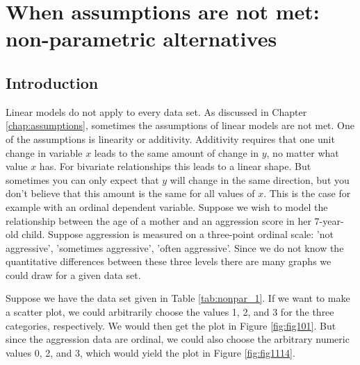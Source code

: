 \documentclass[]{report}\usepackage[]{graphicx}\usepackage[]{color}
\begin{document}

\chapter{When assumptions are not met: non-parametric alternatives}\label{chap:nonpar1}


\section{Introduction}

Linear models do not apply to every data set. As discussed in Chapter \ref{chap:assumptions}, sometimes the assumptions of linear models are not met. One of the assumptions is linearity or additivity. Additivity requires that one unit change in variable $x$ leads to the same amount of change in $y$, no matter what value $x$ has. For bivariate relationships this leads to a linear shape. But sometimes you can only expect that $y$ will change in the same direction, but you don't believe that this amount is the same for all values of $x$. This is the case for example with an ordinal dependent variable. Suppose we wish to model the relationship between the age of a mother and an aggression score in her 7-year-old child. Suppose aggression is measured on a three-point ordinal scale: 'not aggressive', 'sometimes aggressive', 'often aggressive'. Since we do not know the quantitative differences between these three levels there are many graphs we could draw for a given data set.


Suppose we have the data set given in Table \ref{tab:nonpar_1}. If we want to make a scatter plot, we could arbitrarily choose the values 1, 2, and 3 for the three categories, respectively. We would then get the plot in Figure \ref{fig:fig101}. But since the aggression data are ordinal, we could also choose the arbitrary numeric values 0, 2, and 3, which would yield the plot in Figure \ref{fig:fig1114}. 
\end{document}
